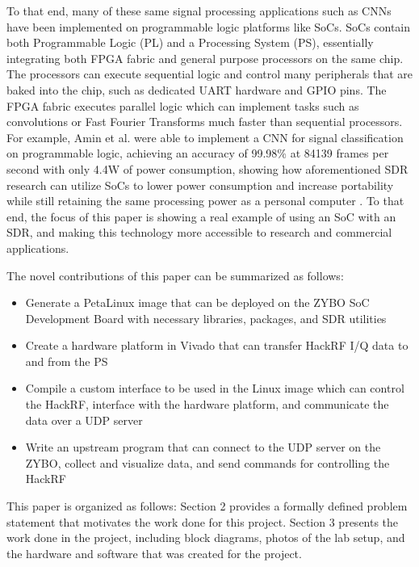 \documentclass[conference]{IEEEtran}
\begin{document}
To that end, many of these same signal processing applications such as CNNs have been
implemented on programmable logic platforms like SoCs. SoCs contain both Programmable Logic (PL) and a Processing System (PS), essentially 
integrating both FPGA fabric and general purpose processors on the same chip. The processors can execute sequential logic and control
many peripherals that are baked into the chip, such as dedicated UART hardware and GPIO pins. The FPGA fabric executes
parallel logic which can implement tasks such as convolutions or Fast Fourier Transforms much faster than sequential processors.
For example, Amin et al. were able to implement a CNN for signal classification on programmable logic, achieving an accuracy of 99.98\% at 84139 
frames per second with only 4.4W of power consumption, showing how aforementioned SDR research can utilize
SoCs to lower power consumption and increase portability while still retaining the same processing power as a personal computer \cite{10794303}. 
To that end, the focus of this paper is showing a real example of using an SoC with an SDR, and making this technology more accessible to research and commercial applications.

The novel contributions of this paper can be summarized as follows:
\begin{itemize}
  \item Generate a PetaLinux image that can be deployed on the ZYBO SoC Development Board with necessary libraries, packages, and SDR utilities
  \item Create a hardware platform in Vivado that can transfer HackRF I/Q data to and from the PS
  \item Compile a custom interface to be used in the Linux image which can control the HackRF, interface with the hardware platform, and communicate the data over a UDP server
  \item Write an upstream program that can connect to the UDP server on the ZYBO, collect and visualize data, and send commands for controlling the HackRF
\end{itemize}

This paper is organized as follows: Section 2 provides a formally defined problem statement that motivates the work done for this project.
Section 3 presents the work done in the project, including block diagrams, photos of the lab setup, and the hardware and software that was created for the project.
\end{document}
